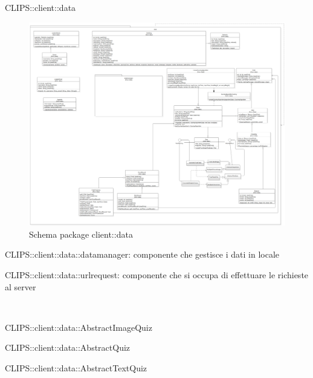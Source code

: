\begin{componente}{CLIPS::client::data}
\begin{figure}[h!]
\centering
\includegraphics[scale=0.2]{img/package/png/client--data.png}
\caption{Schema package client::data}
 \end{figure}
\begin{compPackageContenuti}
\item CLIPS::client::data::datamanager: componente che gestisce i dati in locale
\item CLIPS::client::data::urlrequest: componente che si occupa di effettuare le richieste al server
\end{compPackageContenuti}
\begin{compClassi} \\
\begin{classe}{CLIPS::client::data::AbstractImageQuiz}
\begin{classeRelazioni}
\end{classeRelazioni}
\end{classe}\begin{classe}{CLIPS::client::data::AbstractQuiz}
\end{classe}\begin{classe}{CLIPS::client::data::AbstractTextQuiz}

\end{classe}
\end{compClassi}
\end{componente}
